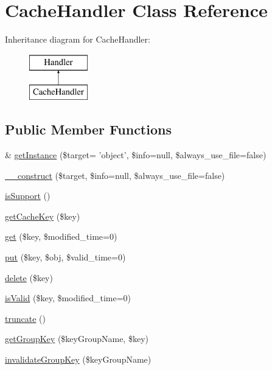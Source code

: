 \hypertarget{classCacheHandler}{\section{Cache\-Handler Class Reference}
\label{classCacheHandler}
}
Inheritance diagram for Cache\-Handler\-:\begin{figure}[H]
\begin{center}
\leavevmode
\includegraphics[height=2.000000cm]{classCacheHandler}
\end{center}
\end{figure}
\subsection*{Public Member Functions}
\begin{DoxyCompactItemize}
\item 
\& \hyperlink{classCacheHandler_a2fce85cb82ab180ce9d6bcea61a54eec}{get\-Instance} (\$target= 'object', \$info=null, \$always\-\_\-use\-\_\-file=false)
\item 
\hyperlink{classCacheHandler_a8132988a88e2faab75af6541d83bbd49}{\-\_\-\-\_\-construct} (\$target, \$info=null, \$always\-\_\-use\-\_\-file=false)
\item 
\hyperlink{classCacheHandler_a4c137721670e0e9ce1d60bdd2f7235bb}{is\-Support} ()
\item 
\hyperlink{classCacheHandler_ab849392ce5ea0d57208f39d8a6a4fa43}{get\-Cache\-Key} (\$key)
\item 
\hyperlink{classCacheHandler_af726ae7803e5a73dee47bb43fc1fb8fc}{get} (\$key, \$modified\-\_\-time=0)
\item 
\hyperlink{classCacheHandler_af7fe9532fb10504cee980d7581a31995}{put} (\$key, \$obj, \$valid\-\_\-time=0)
\item 
\hyperlink{classCacheHandler_af51c1473c877ab5e20336d0d719c27d7}{delete} (\$key)
\item 
\hyperlink{classCacheHandler_a249fec6acdf496c8e7e3d5d9c24bc34a}{is\-Valid} (\$key, \$modified\-\_\-time=0)
\item 
\hyperlink{classCacheHandler_a10046e23ee8c8ef41bbbb69b2dda7889}{truncate} ()
\item 
\hyperlink{classCacheHandler_ab777b6b22477848324a25346da869596}{get\-Group\-Key} (\$key\-Group\-Name, \$key)
\item 
\hyperlink{classCacheHandler_a43118f91508ad5695a13f7a332cc9389}{invalidate\-Group\-Key} (\$key\-Group\-Name)
\end{DoxyCompactItemize}
